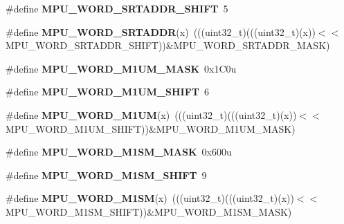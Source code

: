 \begin{DoxyCompactItemize}
\item 
\#define {\bfseries M\+P\+U\+\_\+\+W\+O\+R\+D\+\_\+\+S\+R\+T\+A\+D\+D\+R\+\_\+\+S\+H\+I\+FT}~5\hypertarget{group__MPU__Register__Masks_ga2a0a92430b9fff9f248ae1ffbe086513}{}\label{group__MPU__Register__Masks_ga2a0a92430b9fff9f248ae1ffbe086513}

\item 
\#define {\bfseries M\+P\+U\+\_\+\+W\+O\+R\+D\+\_\+\+S\+R\+T\+A\+D\+DR}(x)~(((uint32\+\_\+t)(((uint32\+\_\+t)(x))$<$$<$M\+P\+U\+\_\+\+W\+O\+R\+D\+\_\+\+S\+R\+T\+A\+D\+D\+R\+\_\+\+S\+H\+I\+FT))\&M\+P\+U\+\_\+\+W\+O\+R\+D\+\_\+\+S\+R\+T\+A\+D\+D\+R\+\_\+\+M\+A\+SK)\hypertarget{group__MPU__Register__Masks_ga5e4ffc54c4abc1bbc57380106cf69018}{}\label{group__MPU__Register__Masks_ga5e4ffc54c4abc1bbc57380106cf69018}

\item 
\#define {\bfseries M\+P\+U\+\_\+\+W\+O\+R\+D\+\_\+\+M1\+U\+M\+\_\+\+M\+A\+SK}~0x1\+C0u\hypertarget{group__MPU__Register__Masks_gaeac86ca30363b0e3680afeb453979567}{}\label{group__MPU__Register__Masks_gaeac86ca30363b0e3680afeb453979567}

\item 
\#define {\bfseries M\+P\+U\+\_\+\+W\+O\+R\+D\+\_\+\+M1\+U\+M\+\_\+\+S\+H\+I\+FT}~6\hypertarget{group__MPU__Register__Masks_gaddd6babdd00ce10ca794e6fb8b49c1a8}{}\label{group__MPU__Register__Masks_gaddd6babdd00ce10ca794e6fb8b49c1a8}

\item 
\#define {\bfseries M\+P\+U\+\_\+\+W\+O\+R\+D\+\_\+\+M1\+UM}(x)~(((uint32\+\_\+t)(((uint32\+\_\+t)(x))$<$$<$M\+P\+U\+\_\+\+W\+O\+R\+D\+\_\+\+M1\+U\+M\+\_\+\+S\+H\+I\+FT))\&M\+P\+U\+\_\+\+W\+O\+R\+D\+\_\+\+M1\+U\+M\+\_\+\+M\+A\+SK)\hypertarget{group__MPU__Register__Masks_gaa810c09e45845f30787202611e33b06d}{}\label{group__MPU__Register__Masks_gaa810c09e45845f30787202611e33b06d}

\item 
\#define {\bfseries M\+P\+U\+\_\+\+W\+O\+R\+D\+\_\+\+M1\+S\+M\+\_\+\+M\+A\+SK}~0x600u\hypertarget{group__MPU__Register__Masks_ga693c293e0d79e4e10f3e2c955a07afaf}{}\label{group__MPU__Register__Masks_ga693c293e0d79e4e10f3e2c955a07afaf}

\item 
\#define {\bfseries M\+P\+U\+\_\+\+W\+O\+R\+D\+\_\+\+M1\+S\+M\+\_\+\+S\+H\+I\+FT}~9\hypertarget{group__MPU__Register__Masks_ga41b28fc0062d523a3f560d2362a1505b}{}\label{group__MPU__Register__Masks_ga41b28fc0062d523a3f560d2362a1505b}

\item 
\#define {\bfseries M\+P\+U\+\_\+\+W\+O\+R\+D\+\_\+\+M1\+SM}(x)~(((uint32\+\_\+t)(((uint32\+\_\+t)(x))$<$$<$M\+P\+U\+\_\+\+W\+O\+R\+D\+\_\+\+M1\+S\+M\+\_\+\+S\+H\+I\+FT))\&M\+P\+U\+\_\+\+W\+O\+R\+D\+\_\+\+M1\+S\+M\+\_\+\+M\+A\+SK)\hypertarget{group__MPU__Register__Masks_gaafe2d86cd721413d90c73d8cc2b13c16}{}\label{group__MPU__Register__Masks_gaafe2d86cd721413d90c73d8cc2b13c16}


\end{DoxyCompactItemize}
